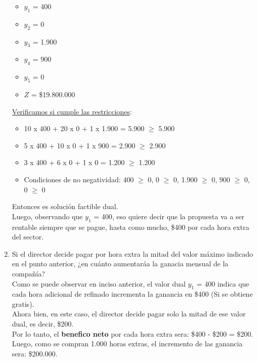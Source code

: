 \documentclass[10pt,a4paper]{article}
\begin{document}
\begin{enumerate}
\begin{itemize}
        \item $y_{1}$ = 400
        \item $y_{2}$ = 0
        \item $y_{3}$ = 1.900
        \item $y_{4}$ = 900
        \item $y_{5}$ = 0
        \item $Z$ = \$19.800.000\\

    \end{itemize}

    \underline{Verificamos si cumple las restricciones}:

    \begin{itemize}

        \item 10 x 400 + 20 x 0 + 1 x 1.900 = 5.900 $\geq$ 5.900
        \item 5 x 400 + 10 x 0 + 1 x 900 = 2.900 $\geq$ 2.900
        \item 3 x 400 + 6 x 0 + 1 x 0 = 1.200 $\geq$ 1.200
        \item Condiciones de no negatividad: 400 $\geq$ 0, 0 $\geq$ 0, 1.900 $\geq$ 0, 900 $\geq$ 0, 0 $\geq$ 0\\

    \end{itemize}

    Entonces es solución factible dual.\\

    Luego, observando que $y_{1}$ = 400, eso quiere decir que la propuesta va a ser rentable siempre que se pague, hasta como mucho, \$400 por cada hora extra del sector. \\

    \clearpage

    \item Si el director decide pagar por hora extra la mitad del valor máximo indicado en el punto anterior, ¿en cuánto
    aumentaráa la ganacia mensual de la compañía? \\

    Como se puede observar en inciso anterior, el valor dual $y_{1}$ = 400 indica que cada hora adicional de refinado incrementa la ganancia en \$400 (Si
    se obtiene gratis). \\

    Ahora bien, en este caso, el director decide pagar solo la mitad de ese valor dual, es decir, \$200.\\
    Por lo tanto, el \textbf{benefico neto} por cada hora extra sera: \$400 - \$200 = \$200. \\
    Luego, como se compran 1.000 horas extras, el incremento de las ganancia sera: \$200.000.\\


\end{enumerate}
\end{document}
